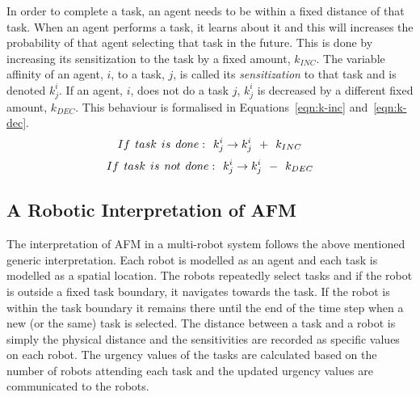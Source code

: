 \documentclass{intech}
\begin{document}
In order to complete a task, an agent needs to be within a fixed distance of that task.  When an agent performs a task, it learns about it and this will increases the probability of that agent selecting that task in the future.  This is done by increasing its sensitization to the task by a fixed amount, $k_{INC}$. The variable affinity of an agent, $i$, to a task, $j$, is called its {\em sensitization} to that task and is denoted $k^{i}_{j}$.  If an agent, $i$, does not do a task $j$, $k^i_j$ is decreased by a different fixed amount, $k_{DEC}$.  This behaviour is formalised in Equations~\ref{eqn:k-inc} and~\ref{eqn:k-dec}.
\begin{equation}
 If\hspace*{0.15cm}task\hspace*{0.15cm}is\hspace*{0.15cm}done:\hspace*{0.15cm}  k^i_j \rightarrow   k^i_j \hspace*{0.15cm} + \hspace*{0.15cm} k_{INC}
\label{eqn:k-inc}
\end{equation}
\begin{equation}
 If\hspace*{0.15cm}task\hspace*{0.15cm}is\hspace*{0.15cm}not\hspace*{0.15cm}done:\hspace*{0.15cm}  k^i_j \rightarrow   k^i_j \hspace*{0.15cm} - \hspace*{0.15cm} k_{DEC}
\label{eqn:k-dec}
\end{equation}

\subsection{A Robotic Interpretation of AFM}
\label{afm:mrs-interpretation}
The interpretation of AFM in a multi-robot system follows the above mentioned generic interpretation.  Each robot is modelled as an agent and each task is modelled as a spatial location.  The robots repeatedly select tasks and if the robot is outside a fixed task boundary, it navigates towards the task.  If the robot is within the task boundary it remains there until the end of the time step when a new (or the same) task is selected.
The distance between a task and a robot is simply the physical distance and the sensitivities are recorded as specific values on each robot.
The urgency values of the tasks are calculated based on the number of robots attending each task and the updated urgency values are communicated to the robots.
\end{document}

